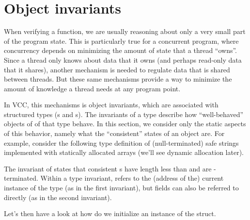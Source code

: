 \section{Object invariants}
\label{sect:invariants}


When verifying a function, we are usually reasoning about only a very
small part of the program state. This is particularly true for a
concurrent program, where concurrency depends on minimizing the amount
of state that a thread ``owns''. Since a thread only knows about data
that it owns (and perhaps read-only data that it shares), another
mechanism is needed to regulate data that is shared between
threads. But these same mechanisms provide a way to minimize the
amount of knowledge a thread needs at any program point.

In VCC, this mechanisms is object invariants, which are associated
with structured types (s and s). The invariants
of a type describe how ``well-behaved'' objects of of that type
behave. In this section, we consider only the static aspects of this
behavior, namely what the ``consistent'' states of an object are. For
example, consider the following type definition of (null-terminated)
safe strings implemented with statically allocated arrays (we'll see
dynamic allocation later).


\noindent
The invariant of  states that consistent
s have length less than  and are
-terminated.  Within a type invariant, \vcc{\this} refers to
the (address of the) current instance of the type (as in the first
invariant), but fields can also be referred to directly (as in the
second invariant). 


Let's then have a look at how do we initialize an instance of the  struct.


